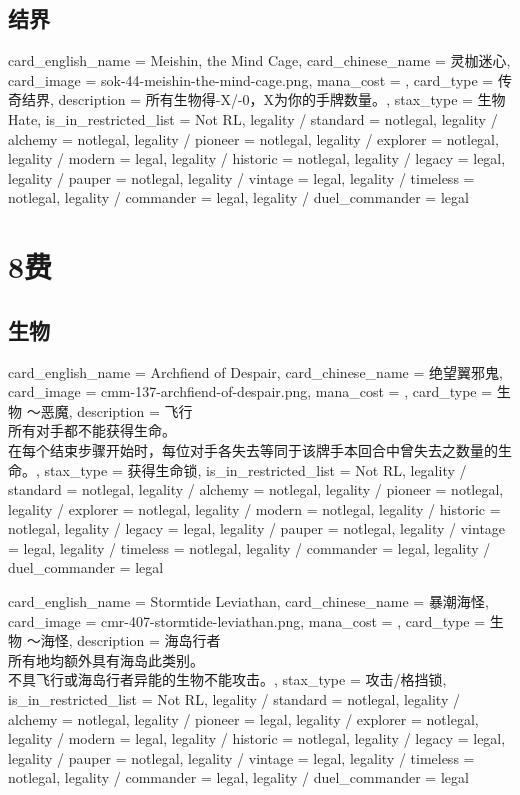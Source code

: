 \documentclass[lang = cn, color = black, 10pt]{AllThatStax}
\begin{document}
\section{结界}

\card
{
	card_english_name = {Meishin, the Mind Cage},
	card_chinese_name = {灵枷迷心},
	card_image = sok-44-meishin-the-mind-cage.png,
	mana_cost = ,
	card_type = 传奇结界,
	description = {所有生物得-X/-0，X为你的手牌数量。},
	stax_type = 生物Hate,
	is_in_restricted_list = Not RL,
	legality / standard = notlegal,
	legality / alchemy = notlegal,
	legality / pioneer = notlegal,
	legality / explorer = notlegal,
	legality / modern = legal,
	legality / historic = notlegal,
	legality / legacy = legal,
	legality / pauper = notlegal,
	legality / vintage = legal,
	legality / timeless = notlegal,
	legality / commander = legal,
	legality / duel_commander = legal
}

\chapter{8费}

\section{生物}

\card
{
	card_english_name = {Archfiend of Despair},
	card_chinese_name = {绝望翼邪鬼},
	card_image = cmm-137-archfiend-of-despair.png,
	mana_cost = ,
	card_type = 生物 ～恶魔,
	description = {飞行\\
		所有对手都不能获得生命。\\
		在每个结束步骤开始时，每位对手各失去等同于该牌手本回合中曾失去之数量的生命。},
	stax_type = 获得生命锁,
	is_in_restricted_list = Not RL,
	legality / standard = notlegal,
	legality / alchemy = notlegal,
	legality / pioneer = notlegal,
	legality / explorer = notlegal,
	legality / modern = notlegal,
	legality / historic = notlegal,
	legality / legacy = legal,
	legality / pauper = notlegal,
	legality / vintage = legal,
	legality / timeless = notlegal,
	legality / commander = legal,
	legality / duel_commander = legal
}

\card
{
	card_english_name = {Stormtide Leviathan},
	card_chinese_name = {暴潮海怪},
	card_image = cmr-407-stormtide-leviathan.png,
	mana_cost = ,
	card_type = 生物 ～海怪,
	description = {海岛行者\\
		所有地均额外具有海岛此类别。\\
		不具飞行或海岛行者异能的生物不能攻击。},
	stax_type = 攻击/格挡锁,
	is_in_restricted_list = Not RL,
	legality / standard = notlegal,
	legality / alchemy = notlegal,
	legality / pioneer = legal,
	legality / explorer = notlegal,
	legality / modern = legal,
	legality / historic = notlegal,
	legality / legacy = legal,
	legality / pauper = notlegal,
	legality / vintage = legal,
	legality / timeless = notlegal,
	legality / commander = legal,
	legality / duel_commander = legal
}
\end{document}
